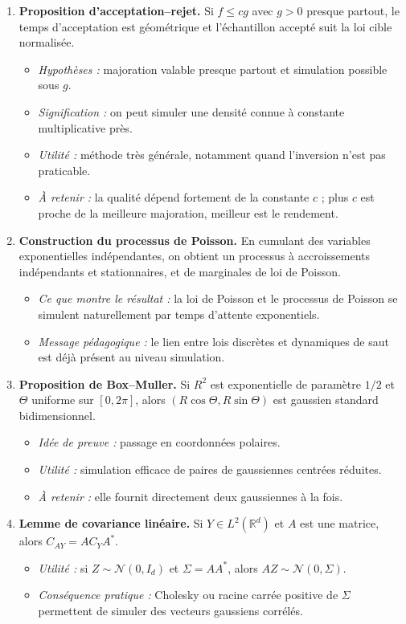 \documentclass[11pt,a4paper]{article}
\newcommand{\R}{\mathbb{R}}
\begin{document}
\begin{enumerate}[label=\textbf{\arabic*.}]
  \item \textbf{Proposition d'acceptation--rejet.} Si $f\le cg$ avec $g>0$ presque partout, le temps d'acceptation est géométrique et l'échantillon accepté suit la loi cible normalisée.
  \begin{itemize}
    \item \emph{Hypothèses :} majoration valable presque partout et simulation possible sous $g$.
    \item \emph{Signification :} on peut simuler une densité connue à constante multiplicative près.
    \item \emph{Utilité :} méthode très générale, notamment quand l'inversion n'est pas praticable.
    \item \emph{À retenir :} la qualité dépend fortement de la constante $c$ ; plus $c$ est proche de la meilleure majoration, meilleur est le rendement.
  \end{itemize}

  \item \textbf{Construction du processus de Poisson.} En cumulant des variables exponentielles indépendantes, on obtient un processus à accroissements indépendants et stationnaires, et de marginales de loi de Poisson.
  \begin{itemize}
    \item \emph{Ce que montre le résultat :} la loi de Poisson et le processus de Poisson se simulent naturellement par temps d'attente exponentiels.
    \item \emph{Message pédagogique :} le lien entre lois discrètes et dynamiques de saut est déjà présent au niveau simulation.
  \end{itemize}

  \item \textbf{Proposition de Box--Muller.} Si $R^2$ est exponentielle de paramètre $1/2$ et $\Theta$ uniforme sur $[0,2\pi]$, alors $(R\cos\Theta,R\sin\Theta)$ est gaussien standard bidimensionnel.
  \begin{itemize}
    \item \emph{Idée de preuve :} passage en coordonnées polaires.
    \item \emph{Utilité :} simulation efficace de paires de gaussiennes centrées réduites.
    \item \emph{À retenir :} elle fournit directement deux gaussiennes à la fois.
  \end{itemize}

  \item \textbf{Lemme de covariance linéaire.} Si $Y\in L^2(\R^d)$ et $A$ est une matrice, alors $C_{AY}=AC_YA^\ast$.
  \begin{itemize}
    \item \emph{Utilité :} si $Z\sim\mathcal N(0,I_d)$ et $\Sigma=AA^\ast$, alors $AZ\sim\mathcal N(0,\Sigma)$.
    \item \emph{Conséquence pratique :} Cholesky ou racine carrée positive de $\Sigma$ permettent de simuler des vecteurs gaussiens corrélés.
  \end{itemize}
\end{enumerate}
\end{document}
